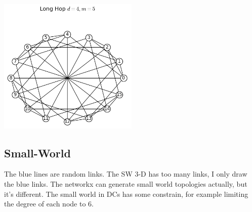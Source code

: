 \documentclass[11pt]{article}
\begin{document}
\centerline{\includegraphics[width=0.5\textwidth]{figure/draw/LongHop}}

\subsection{Small-World}
The blue lines are random links. The SW 3-D has too many links, I only draw the blue links. The networkx can generate small world topologies actually, but it's different. The small world in DCs has some constrain, for example limiting the degree of each node to 6. 
\end{document}
